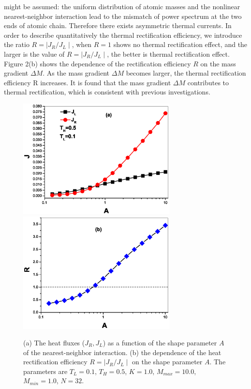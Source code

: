 \documentclass[pra,preprint,superscriptaddress,showkeys,showpacs]{revtex4}
\begin{document}
might be assumed: the uniform distribution of atomic masses and the
nonlinear nearest-neighbor interaction lead to the mismatch of power
spectrum at the two ends of atomic chain. Therefore there exists
asymmetric thermal currents. In order to describe quantitatively the
thermal rectification efficiency, we introduce the ratio $R=\mid
J_{R}/J_{L}\mid$, when $R=1$ shows no thermal rectification effect,
and the larger is
the value of $R=\mid J_{R}/J_{L}\mid$, the better is thermal rectification effect.\\
\indent Figure 2(b) shows the dependence of the rectification
efficiency $R$ on the mass gradient $\Delta M$. As the mass gradient
$\Delta M$ becomes larger, the thermal rectification efficiency R
increases. It is found that the mass gradient $\Delta M$ contributes
to thermal rectification, which is consistent with previous investigations\cite{a19,a20,a21}.\\
\begin{figure}
\centering
\includegraphics[width=8cm]{fig3a.eps}
\centering
\includegraphics[width=8cm]{fig3b.eps}
\caption{(a) The heat fluxes ($J_{R},J_{L}$) as a function of the
shape parameter $A$ of the nearest-neighbor interaction. (b) the
dependence of the heat rectification efficiency $R=\mid
J_{R}/J_{L}\mid$ on the shape parameter $A$. The parameters are
$T_{L}=0.1$, $T_{H}=0.5$, $K=1.0$, $M_{max}=10.0$, $M_{min}=1.0$,
$N=32$.}
\end{figure}
\end{document}
